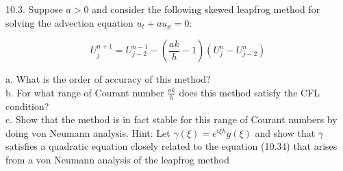 10.3. Suppose $a>0$ and consider the following skewed leapfrog method for solving the advection equation
$u_t + au_x = 0$:

$$U^{n+1}_j=U^{n-1}_{j-2}-(\frac{ak}{h}-1)(U^n_j-U^n_{j-2})$$

a. What is the order of accuracy of this method?\\
b. For what range of Courant number $\frac{ak}{h}$ does this method satisfy the CFL condition?\\
c. Show that the method is in fact stable for this range of Courant numbers by doing von Neumann
analysis. Hint: Let $\gamma(\xi)=e^{i\xi h}g(\xi)$ and show that $\gamma$ satisfies a quadratic equation
closely related to the equation (10.34) that arises from a von Neumann analysis of the leapfrog method\\

